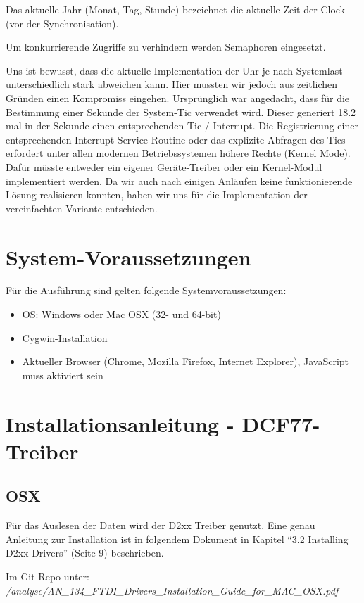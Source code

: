 Das aktuelle Jahr (Monat, Tag, Stunde) bezeichnet die aktuelle Zeit der Clock (vor der Synchronisation).

Um konkurrierende Zugriffe zu verhindern werden Semaphoren eingesetzt.

Uns ist bewusst, dass die aktuelle Implementation der Uhr je nach Systemlast unterschiedlich stark abweichen kann. Hier mussten wir jedoch aus zeitlichen Gründen einen Kompromiss eingehen. Ursprünglich war angedacht, dass für die Bestimmung einer Sekunde der System-Tic verwendet wird. Dieser generiert 18.2 mal in der Sekunde einen entsprechenden Tic / Interrupt. Die Registrierung einer entsprechenden Interrupt Service Routine oder das explizite Abfragen des Tics erfordert unter allen modernen Betriebssystemen höhere Rechte (Kernel Mode). Dafür müsste entweder ein eigener Geräte-Treiber oder ein Kernel-Modul implementiert werden. Da wir auch nach einigen Anläufen keine funktionierende Lösung realisieren konnten, haben wir uns für die Implementation der vereinfachten Variante entschieden.

\section{System-Voraussetzungen}
Für die Ausführung sind gelten folgende Systemvoraussetzungen:

\begin{itemize}
\item OS: Windows oder Mac OSX (32- und 64-bit)
\item Cygwin-Installation
\item Aktueller Browser (Chrome, Mozilla Firefox, Internet Explorer), JavaScript muss aktiviert sein
\end{itemize}

\section{Installationsanleitung - DCF77-Treiber}
\subsection{OSX}
Für das Auslesen der Daten wird der D2xx Treiber genutzt. Eine genau Anleitung zur Installation ist in folgendem Dokument in Kapitel "`3.2 Installing D2xx Drivers"' (Seite 9) beschrieben.

Im Git Repo unter:\\
\textit{/analyse/AN\_134\_FTDI\_Drivers\_Installation\_Guide\_for\_MAC\_OSX.pdf}

